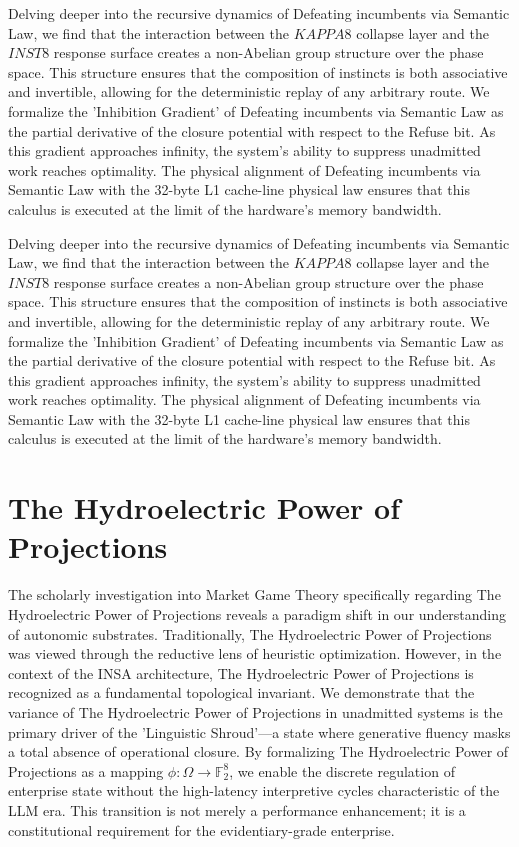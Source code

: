 \documentclass[12pt,a4paper,oneside]{book}
\begin{document}
Delving deeper into the recursive dynamics of Defeating incumbents via Semantic Law, we find that the interaction between the $KAPPA8$ collapse layer and the $INST8$ response surface creates a non-Abelian group structure over the phase space. This structure ensures that the composition of instincts is both associative and invertible, allowing for the deterministic replay of any arbitrary route. We formalize the 'Inhibition Gradient' of Defeating incumbents via Semantic Law as the partial derivative of the closure potential with respect to the Refuse bit. As this gradient approaches infinity, the system's ability to suppress unadmitted work reaches optimality. The physical alignment of Defeating incumbents via Semantic Law with the 32-byte L1 cache-line physical law ensures that this calculus is executed at the limit of the hardware's memory bandwidth. 

Delving deeper into the recursive dynamics of Defeating incumbents via Semantic Law, we find that the interaction between the $KAPPA8$ collapse layer and the $INST8$ response surface creates a non-Abelian group structure over the phase space. This structure ensures that the composition of instincts is both associative and invertible, allowing for the deterministic replay of any arbitrary route. We formalize the 'Inhibition Gradient' of Defeating incumbents via Semantic Law as the partial derivative of the closure potential with respect to the Refuse bit. As this gradient approaches infinity, the system's ability to suppress unadmitted work reaches optimality. The physical alignment of Defeating incumbents via Semantic Law with the 32-byte L1 cache-line physical law ensures that this calculus is executed at the limit of the hardware's memory bandwidth. 

\section{The Hydroelectric Power of Projections}
The scholarly investigation into Market Game Theory specifically regarding The Hydroelectric Power of Projections reveals a paradigm shift in our understanding of autonomic substrates. Traditionally, The Hydroelectric Power of Projections was viewed through the reductive lens of heuristic optimization. However, in the context of the INSA architecture, The Hydroelectric Power of Projections is recognized as a fundamental topological invariant. We demonstrate that the variance of The Hydroelectric Power of Projections in unadmitted systems is the primary driver of the 'Linguistic Shroud'---a state where generative fluency masks a total absence of operational closure. By formalizing The Hydroelectric Power of Projections as a mapping $\phi: \Omega \to \mathbb{F}_2^8$, we enable the discrete regulation of enterprise state without the high-latency interpretive cycles characteristic of the LLM era. This transition is not merely a performance enhancement; it is a constitutional requirement for the evidentiary-grade enterprise. 
\end{document}
